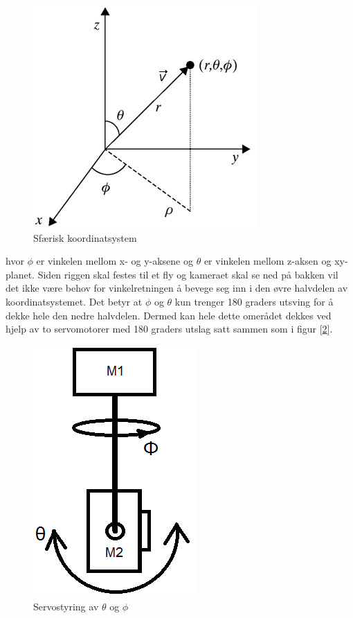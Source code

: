 \begin{figure}[h!]
	\centering
	\includegraphics[scale=0.5]{img/RettVek.jpg}
	\caption{Sfærisk koordinatsystem}
	\label{fig:spher}
\end{figure}

hvor $\phi$ er vinkelen mellom x- og y-aksene og $\theta$ er vinkelen mellom z-aksen og xy-planet. Siden riggen skal festes til et fly og kameraet skal se ned på bakken vil det ikke være behov for vinkelretningen å bevege seg inn i den øvre halvdelen av koordinatsystemet. Det betyr at $\phi$ og $\theta$ kun trenger 180 graders utsving for å dekke hele den nedre halvdelen. Dermed kan hele dette omerådet dekkes ved hjelp av to servomotorer med 180 graders utslag satt sammen som i figur [\ref{fig:IdeRigg}]. 

\begin{figure}[h!]
	\centering
	\includegraphics[scale=0.5]{img/BasicRiggIde.png}
	\caption{Servostyring av $\theta$ og $\phi$}
	\label{fig:IdeRigg}
\end{figure}

